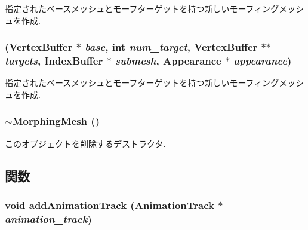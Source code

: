 指定されたベースメッシュとモーフターゲットを持つ新しいモーフィングメッシュを作成. \hypertarget{classm3g_1_1MorphingMesh_4a2347ee9c813fa1a6eef998f37bf6d5}{
\subsubsection[{MorphingMesh}]{ ({\bf VertexBuffer} $\ast$ {\em base}, \/  int {\em num\_\-target}, \/  {\bf VertexBuffer} $\ast$$\ast$ {\em targets}, \/  {\bf IndexBuffer} $\ast$ {\em submesh}, \/  {\bf Appearance} $\ast$ {\em appearance})}}
\label{classm3g_1_1MorphingMesh_4a2347ee9c813fa1a6eef998f37bf6d5}


指定されたベースメッシュとモーフターゲットを持つ新しいモーフィングメッシュを作成. \hypertarget{classm3g_1_1MorphingMesh_cdafafba64a0167f28f3b66ac4b9d7d6}{
\subsubsection[{$\sim$MorphingMesh}]{\setlength{\rightskip}{0pt plus 5cm}$\sim${\bf MorphingMesh} ()}}
\label{classm3g_1_1MorphingMesh_cdafafba64a0167f28f3b66ac4b9d7d6}


このオブジェクトを削除するデストラクタ. 

\subsection{関数}
\hypertarget{classm3g_1_1MorphingMesh_415c0b110f95410ded9b85e5d99a496b}{
\subsubsection[{addAnimationTrack}]{\setlength{\rightskip}{0pt plus 5cm}void addAnimationTrack ({\bf AnimationTrack} $\ast$ {\em animation\_\-track})}}
\label{classm3g_1_1MorphingMesh_415c0b110f95410ded9b85e5d99a496b}


